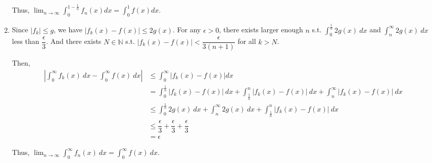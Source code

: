 \documentclass[12pt]{article}
\begin{document}
\begin{enumerate}
    Thus, $\displaystyle\lim_{n\to\infty} \displaystyle\int_{0}^{1-\frac{1}{n}} f_n(x) dx = \displaystyle\int_0^1 f(x) dx$.

    \item Since $|f_k| \leq g$, we have $|f_k(x) - f(x)| \leq 2g(x)$.
    For any $\epsilon > 0$, there exists larger enough $n$ s.t. 
    $\displaystyle\int_{0}^{\frac{1}{n}} 2g(x)\ dx$ and $\displaystyle\int_{n}^{\infty} 2g(x)\ dx$ less than $\dfrac{\epsilon}{3}$.
    And there exists $N \in \mathbb{N}$ s.t. $|f_k(x) - f(x)| < \dfrac{\epsilon}{3(n+1)}$ for all $k > N$.

    Then, \begin{align*}
        \left|\int_{0}^{\infty} f_k(x)\ dx - \int_{0}^{\infty} f(x)\ dx\right| &\leq \int_{0}^{\infty} |f_k(x)- f(x)| dx\\
        &= \int_{0}^{\frac{1}{n}} |f_k(x) - f(x)|\ dx + \int_{\frac{1}{n}}^{n} |f_k(x) - f(x)|\ dx + \int_{n}^{\infty} |f_k(x) - f(x)|\ dx\\
        &\leq \int_{0}^{\frac{1}{n}} 2g(x)\ dx + \int_{n}^{\infty} 2g(x)\ dx + \int_{\frac{1}{n}}^{n} |f_k(x) - f(x)|\ dx\\
        &\leq \dfrac{\epsilon}{3} + \dfrac{\epsilon}{3} + \dfrac{\epsilon}{3}\\
        &= \epsilon
    \end{align*}

    Thus, $\displaystyle\lim_{n\to \infty} \displaystyle\int_{0}^{\infty} f_n(x)\ dx = \displaystyle\int_{0}^{\infty} f(x)\ dx$.
\end{enumerate}
\end{document}
